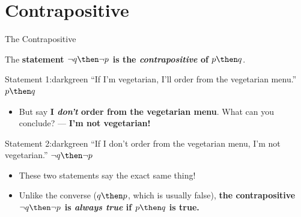 \documentclass[12pt,aspectratio=1610, handout]{beamer}
\begin{document}
\section{Contrapositive}

\begin{frame}{The Contrapositive}
	\begin{definition}[Contrapositive]
		The \textbf{statement $\neg q \then \neg p$ is the \emph{contrapositive} of $p \then q$}. 
	\end{definition} \p
	
		\begin{colorblock}{Statement 1:}{darkgreen}
			``If I'm vegetarian, I'll order from the vegetarian menu.'' $p \then q$ \p
		\end{colorblock}
		
		\begin{itemize}
		\item But say \textbf{I \emph{don't} order from the vegetarian menu}. What can you conclude? \p --- \textbf{I'm not vegetarian!}\p
		\end{itemize}
		
		
		\begin{colorblock}{Statement 2:}{darkgreen}
			``If I don't order from the vegetarian menu, I'm not vegetarian.'' $\neg q \then \neg p$\p
		\end{colorblock}
		
		\begin{itemize}
			\item These two statements say the exact same thing! \p
	    				
		\item[\finger] Unlike the converse ($q \then p$, which is usually false), \textbf{the contrapositive $\neg q \then \neg p$ is \emph{always true} if $p \then q$ is true. }
		\end{itemize}
%	
\end{frame}
\end{document}
